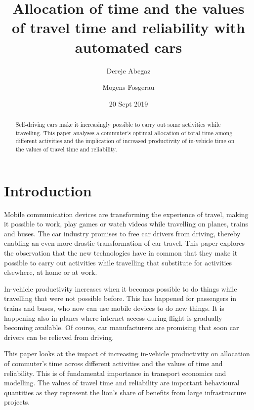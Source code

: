 \documentclass[12pt,a4paper,british]{article}
\begin{document}
\title{Allocation of time and the values of travel time and reliability with automated cars}

\author{Dereje Abegaz \and Mogens Fosgerau}

\date{20 Sept 2019}

\maketitle

\begin{abstract}
Self-driving cars make it increasingly possible to carry out some activities while travelling. This paper analyses a commuter's optimal allocation of total time among different activities and the implication of increased productivity of in-vehicle time on the values of travel time and reliability.
\end{abstract}

\section{Introduction}
\label{sec:introduction}

Mobile communication devices are transforming the experience of travel, making it possible to work, play games or watch videos while travelling on planes, trains and buses. The car industry promises to free car drivers from driving, thereby enabling an even more drastic transformation of car travel. This paper explores the observation that the new technologies have in common that they make it possible to carry out activities while travelling that substitute for activities elsewhere, at home or at work.

In-vehicle productivity increases when it becomes possible to do things while travelling that were not possible before. This has happened for passengers in trains and buses, who now can use mobile devices  to do new things. It is happening also in planes where internet access during flight is gradually becoming available. Of course, car manufacturers are promising that soon car drivers can be relieved from driving.

This paper looks at the impact of increasing in-vehicle productivity on allocation of commuter's time across different activities and the values of time and reliability. This is of fundamental importance in transport economics and modelling. The values of travel time and reliability are important behavioural quantities as they represent the lion's share of benefits from large infrastructure projects. 
\end{document}
